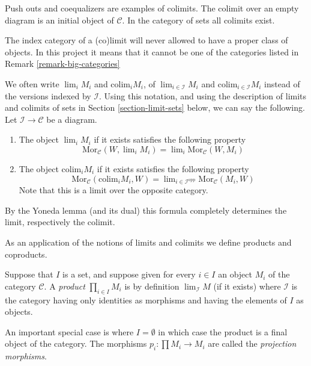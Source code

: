\noindent
Push outs and coequalizers are examples of colimits.
The colimit over an empty diagram is an initial object 
of $\mathcal{C}$. In the category of sets all colimits exist.

\begin{remark}
\label{remark-diagram-small}
The index category of a (co)limit will never allowed to have
a proper class of objects. In this project it means that
it cannot be one of the categories listed in
Remark \ref{remark-big-categories}
\end{remark}

\begin{remark}
\label{remark-limit-colim}
We often write $\lim_i M_i$ and $\text{colim}_i M_i$,
of $\lim_{i\in \mathcal{I}} M_i$ and $\text{colim}_{i\in \mathcal{I}} M_i$
instead of the versions indexed by $\mathcal{I}$.
Using this notation, and using the description of
limits and colimits of sets in Section \ref{section-limit-sets}
below, we can say the following. 
Let $\mathcal{I} \to \mathcal{C}$ be a diagram.
\begin{enumerate}
\item The object $\lim_i M_i$ if it
exists satisfies the following property
$$
\text{Mor}_{\mathcal{C}}(W, \lim\nolimits_i M_i)
=
\lim\nolimits_i \text{Mor}_{\mathcal{C}}(W, M_i)
$$
\item The object $\text{colim}_i M_i$ if it
exists satisfies the following property
$$
\text{Mor}_{\mathcal{C}}(\text{colim}_i M_i, W)
=
\lim\nolimits_{i\in \mathcal{I}^\text{opp}} \text{Mor}_{\mathcal{C}}(M_i, W)
$$
Note that this is a limit over the opposite category.
\end{enumerate}
By the Yoneda lemma (and its dual) this formula completely determines the
limit, respectively the colimit.
\end{remark}

\noindent
As an application of the notions of limits and colimits
we define products and coproducts.

\begin{definition}
\label{definition-product}
Suppose that $I$ is a set, and suppose given for every $i \in I$ an
object $M_i$ of the category $\mathcal{C}$. A {\it product}
$\prod_{i\in I} M_i$ is by definition $\lim_{\mathcal{I}} M$ 
(if it exists)
where $\mathcal{I}$ is the category having only identities as
morphisms and having the elements of $I$ as objects.
\end{definition}

\noindent
An important special case is where $I = \emptyset$ in which case the
product is a final object of the category.
The morphisms $p_i : \prod M_i \to M_i$ are called the
{\it projection morphisms}.

